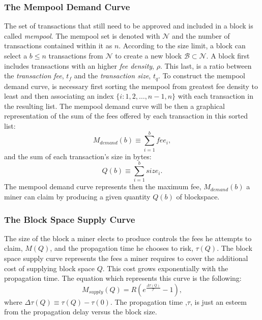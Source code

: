 \documentclass[USenglish]{uit-thesis}
\begin{document}
\subsubsection{The Mempool Demand Curve}
\label{sec:mempooldemand}
The set of transactions that still need to be approved and included
in a block is called \emph{mempool}.
The mempool set is denoted with $\mathcal{N}$ and the number
of transactions contained within it as $n$.
According to the size limit, a block can select a $b \leq n$
transactions from $\mathcal{N}$ to create a
new block $\mathcal{B} \subset \mathcal{N}$.
A block first includes transactions with an higher \emph{fee density}, $\rho$.
This last, is a ratio between
the \emph{transaction fee}, $t_f$ and the \emph{transaction size}, $t_q$.
To construct the mempool demand
curve, is necessary first sorting the mempool from
greatest fee density to least and then
associating an index $\{i: 1,2,\dots,n-1,n\}$ with each
transaction in the resulting list.
The mempool demand curve will be then a graphical
representation of the sum of the fees offered
by each transaction in this sorted list:
\begin{equation}
\label{eq:memdemandcurve}
M_{demand}(b) \equiv \sum_{i=1}^{b} fee_i,
\end{equation}
and the sum of each transaction's size in bytes:
\begin{equation}
\label{eq:transactionsize}
Q(b) \equiv \sum_{i = 1}^{b} size_i.
\end{equation}
The mempool demand curve represents then the maximum fee,
$M_{demand}(b)$
a miner can claim by producing a given quantity $Q(b)$ of blockspace.

\subsubsection{The Block Space Supply Curve}
\label{sec:blockspacesupply}
The size of the block a miner elects to produce controls the fees he attempts to claim, $M(Q)$,
and the propagation time he chooses to risk, $\tau(Q)$. The block space supply curve represents
the fees a miner requires to cover the additional cost of
supplying block space $Q$. This cost grows
exponentially with the propagation time. The equation which
represents this curve is the following:
\begin{equation}
\label{eq:blockspacesupply}
M_{supply}(Q) = R\left(e^{\frac{\Delta \tau (Q)}{\mathcal{T}}} - 1\right),
\end{equation}
where $\Delta \tau (Q) \equiv \tau(Q) - \tau(0)$.
The propagation time ,$\tau$, is just an esteem from
the propagation delay versus the block size.
\end{document}
